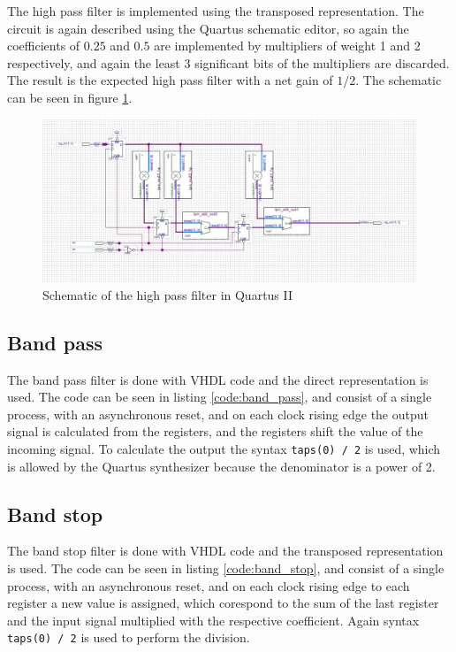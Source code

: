 \documentclass[12pt]{article}   	%
\begin{document}
The high pass filter is implemented using the transposed representation. The circuit is again described using the Quartus schematic editor, so again the coefficients of $0.25$ and $0.5$ are implemented by multipliers of weight 1 and 2 respectively, and again the least 3 significant bits of the multipliers are discarded. The result is the expected high pass filter with a net gain of $1/2$. The schematic can be seen in figure \ref{fig:HP_sh}.


\begin{figure}[htbp]
\begin{center}
\includegraphics[width=\textwidth]{img/high_pass_transposed_graph}
\caption{Schematic of the high pass filter in Quartus II}
\label{fig:HP_sh}
\end{center}
\end{figure}



\subsection{Band pass}

The band pass filter is done with VHDL code and the direct representation is used. The code can be seen in listing \ref{code:band_pass}, and consist of a single process, with an asynchronous reset, and on each clock rising edge the output signal is calculated from the registers, and the registers shift the value of the incoming signal. To calculate the output the syntax \lstinline|taps(0) / 2| is used, which is allowed by the Quartus synthesizer because the denominator is a power of 2.  


\subsection{Band stop}

The band stop filter is done with VHDL code and the transposed representation is used. The code can be seen in listing \ref{code:band_stop}, and consist of a single process, with an asynchronous reset, and on each clock rising edge to each register a new value is assigned, which corespond to the sum of the last register and the input signal multiplied with the respective coefficient. Again syntax \lstinline|taps(0) / 2| is used to perform the division.  
\end{document}
